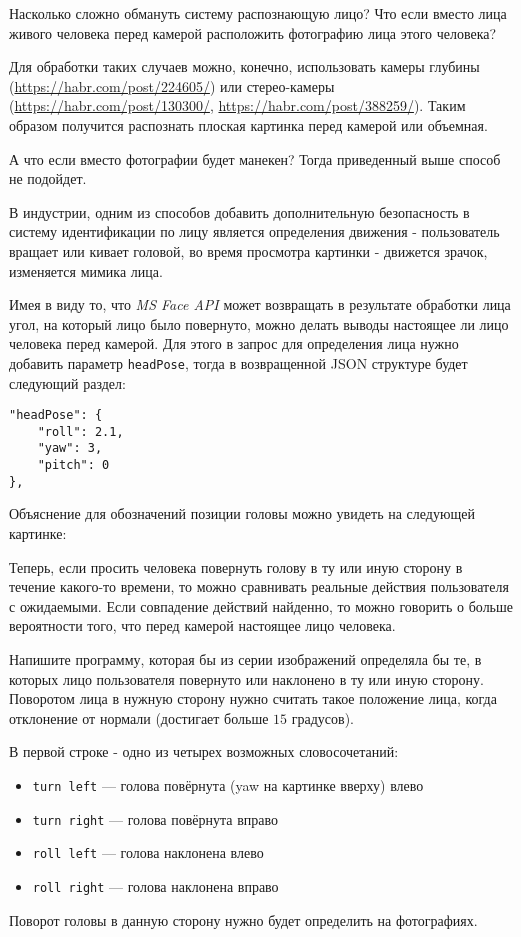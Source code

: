 
Насколько сложно обмануть систему распознающую лицо? Что если вместо лица живого человека перед камерой расположить фотографию лица этого человека?

Для обработки таких случаев можно, конечно, использовать камеры глубины (\url{https://habr.com/post/224605/}) или стерео-камеры (\url{https://habr.com/post/130}\linebreak \url{300/}, \url{https://habr.com/post/388259/}). Таким образом получится распознать плоская картинка перед камерой или объемная.

А что если вместо фотографии будет манекен? Тогда приведенный выше способ не подойдет.

В индустрии, одним из способов добавить дополнительную безопасность в систему идентификации по лицу является определения движения - пользователь вращает или кивает головой, во время просмотра картинки - движется зрачок, изменяется мимика лица.

Имея в виду то, что \textit{MS Face API} может возвращать в результате обработки лица угол, на который лицо было повернуто, можно делать выводы настоящее ли лицо человека перед камерой. Для этого в запрос для определения лица нужно добавить параметр \texttt{headPose}, тогда в возвращенной JSON структуре будет следующий раздел:

\begin{verbatim}
"headPose": {
    "roll": 2.1,
    "yaw": 3,
    "pitch": 0
},    
\end{verbatim}

Объяснение для обозначений позиции головы можно увидеть на следующей картинке:


Теперь, если просить человека повернуть голову в ту или иную сторону в течение какого-то времени, то можно сравнивать реальные действия пользователя с ожидаемыми. Если совпадение действий найденно, то можно говорить о больше вероятности того, что перед камерой настоящее лицо человека.

Напишите программу, которая бы из серии изображений определяла бы те, в которых лицо пользователя повернуто или наклонено в ту или иную сторону. Поворотом лица в нужную сторону нужно считать такое положение лица, когда отклонение от нормали (достигает больше $15$ градусов).


В первой строке - одно из четырех возможных словосочетаний:
\begin{itemize}
  \item \texttt{turn left} --- голова повёрнута (yaw на картинке вверху) влево  
  \item \texttt{turn right} --- голова повёрнута вправо
  \item \texttt{roll left} --- голова наклонена влево
  \item \texttt{roll right} --- голова наклонена вправо
\end{itemize}
Поворот головы в данную сторону нужно будет определить на фотографиях.

